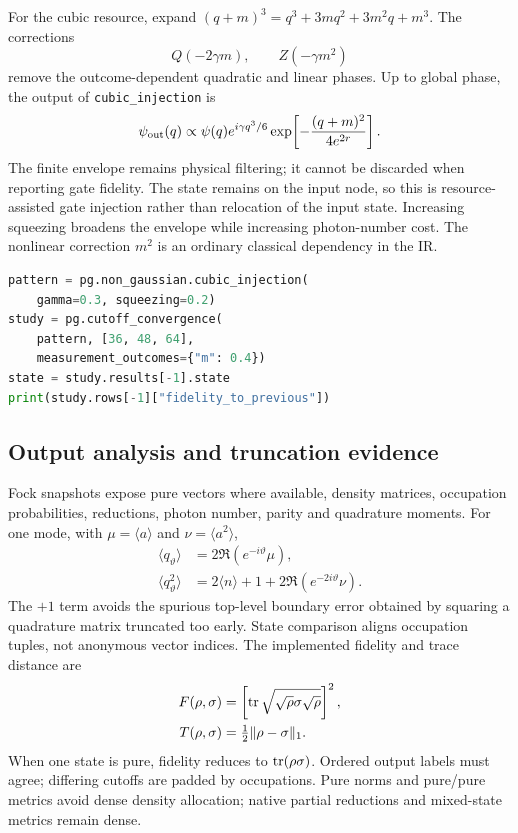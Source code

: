 For the cubic resource, expand
$(q+m)^3=q^3+3mq^2+3m^2q+m^3$. The corrections
\begin{equation}
 Q(-2\gamma m),\qquad Z(-\gamma m^2)
\end{equation}
remove the outcome-dependent quadratic and linear phases. Up to global phase,
the output of \texttt{cubic\_injection} is
\begin{equation}
 \psi_{\rm out}(q)\propto
 \psi(q)e^{i\gamma q^3/6}
 \exp\!\left[-\frac{(q+m)^2}{4e^{2r}}\right].\label{eq:cubicFilter}
\end{equation}
The finite envelope remains physical filtering; it cannot be discarded when
reporting gate fidelity. The state remains on the input node, so this is
resource-assisted gate injection rather than relocation of the input state.
Increasing squeezing broadens the envelope while increasing photon-number cost.
The nonlinear correction $m^2$ is an ordinary classical dependency in the IR.

\begin{lstlisting}[language=Python]
pattern = pg.non_gaussian.cubic_injection(
    gamma=0.3, squeezing=0.2)
study = pg.cutoff_convergence(
    pattern, [36, 48, 64],
    measurement_outcomes={"m": 0.4})
state = study.results[-1].state
print(study.rows[-1]["fidelity_to_previous"])
\end{lstlisting}

\subsection{Output analysis and truncation evidence}

Fock snapshots expose pure vectors where available, density matrices, occupation
probabilities, reductions, photon number, parity and quadrature moments. For
one mode, with $\mu=\langle a\rangle$ and $\nu=\langle a^2\rangle$,
\begin{align}
 \langle q_\vartheta\rangle&=2\Re(e^{-i\vartheta}\mu),\\
 \langle q_\vartheta^2\rangle&=2\langle n\rangle+1+
 2\Re(e^{-2i\vartheta}\nu).
\end{align}
The $+1$ term avoids the spurious top-level boundary error obtained by squaring
a quadrature matrix truncated too early. State comparison aligns occupation
tuples, not anonymous vector indices. The implemented fidelity and trace distance
are
\begin{align}
 F(\rho,\sigma)&=\left[\operatorname{tr}\sqrt{\sqrt\rho\sigma\sqrt\rho}\right]^2,\\
 T(\rho,\sigma)&=\tfrac12\|\rho-\sigma\|_1.
\end{align}
When one state is pure, fidelity reduces to $\operatorname{tr}(\rho\sigma)$.
Ordered output labels must agree; differing cutoffs are padded by occupations.
Pure norms and pure/pure metrics avoid dense density allocation; native partial
reductions and mixed-state metrics remain dense.

